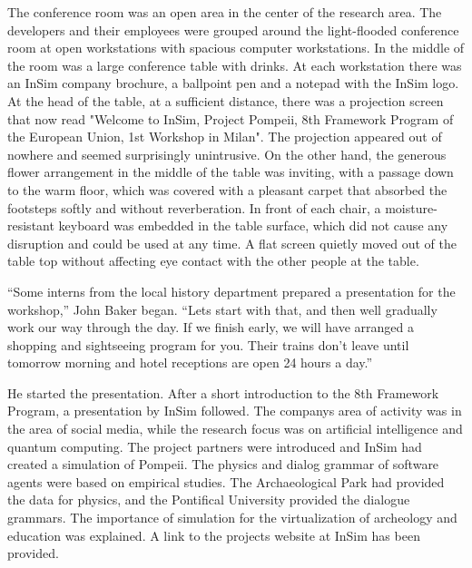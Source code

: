 \documentclass[
]{article}
\begin{document}
The conference room was an open area in the center of the research area.
The developers and their employees were grouped around the light-flooded
conference room at open workstations with spacious computer
workstations. In the middle of the room was a large conference table
with drinks. At each workstation there was an InSim company brochure, a
ballpoint pen and a notepad with the InSim logo. At the head of the
table, at a sufficient distance, there was a projection screen that now
read "Welcome to InSim, Project Pompeii, 8th Framework Program of the
European Union, 1st Workshop in Milan". The projection appeared out of
nowhere and seemed surprisingly unintrusive. On the other hand, the
generous flower arrangement in the middle of the table was inviting,
with a passage down to the warm floor, which was covered with a pleasant
carpet that absorbed the footsteps softly and without reverberation. In
front of each chair, a moisture-resistant keyboard was embedded in the
table surface, which did not cause any disruption and could be used at
any time. A flat screen quietly moved out of the table top without
affecting eye contact with the other people at the table.

``Some interns from the local history department prepared a presentation
for the workshop,'' John Baker began. ``Let\textquotesingle s start with
that, and then we\textquotesingle ll gradually work our way through the
day. If we finish early, we will have arranged a shopping and
sightseeing program for you. Their trains don't leave until tomorrow
morning and hotel receptions are open 24 hours a day.''

He started the presentation. After a short introduction to the 8th
Framework Program, a presentation by InSim followed. The
company\textquotesingle s area of \hspace{0pt}\hspace{0pt}activity was
in the area of \hspace{0pt}\hspace{0pt}social media, while the research
focus was on artificial intelligence and quantum computing. The project
partners were introduced and InSim had created a simulation of Pompeii.
The physics and dialog grammar of software agents were based on
empirical studies. The Archaeological Park had provided the data for
physics, and the Pontifical University provided the dialogue grammars.
The importance of simulation for the virtualization of archeology and
education was explained. A link to the project\textquotesingle s website
at InSim has been provided.
\end{document}
